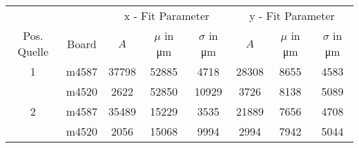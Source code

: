 \begin{tabular}{cccccccc}
	\toprule
	\multicolumn{2}{c}{ }&\multicolumn{3}{c}{x - Fit Parameter}&\multicolumn{3}{c}{y - Fit Parameter}\\ \cmidrule(r){3-5}\cmidrule(r){6-8}
 \rowcolor{white} Pos. Quelle & Board & $A$ & $\mu$ in \si{\micro\meter} & $\sigma$ in \si{\micro\meter} & $A$ & $\mu$ in \si{\micro\meter} & $\sigma$ in \si{\micro\meter}\\
\midrule
1	& m4587 & 37798 & 52885 &  4718 & 28308 & 8655 & 4583 \\
	& m4520 & 2622 & 52850 &  10929 & 3726 & 8138 & 5089 \\
\midrule
2 & m4587 & 35489 & 15229 &  3535 & 21889 & 7656 & 4708 \\
	& m4520 & 2056 & 15068 &  9994 & 2994 & 7942 & 5044 \\
\bottomrule
\end{tabular}

